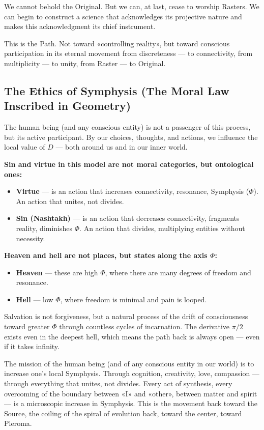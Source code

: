 \documentclass[a4paper,12pt]{article}
\begin{document}
	We cannot behold the Original. But we can, at last, cease to worship Rasters. We can begin to construct a science that acknowledges its projective nature and makes this acknowledgment its chief instrument.
	
	This is the Path. Not toward «controlling reality», but toward conscious participation in its eternal movement from discreteness — to connectivity, from multiplicity — to unity, from Raster — to Original.
	
	\subsection{The Ethics of Symphysis (The Moral Law Inscribed in Geometry)}
	
	The human being (and any conscious entity) is not a passenger of this process, but its active participant. By our choices, thoughts, and actions, we influence the local value of $D$ — both around us and in our inner world.
	
	\textbf{Sin and virtue in this model are not moral categories, but ontological ones:}
	\begin{itemize}
		\item \textbf{Virtue} — is an action that increases connectivity, resonance, Symphysis ($\Phi$). An action that unites, not divides.
		\item \textbf{Sin (Nashtakh)} — is an action that decreases connectivity, fragments reality, diminishes $\Phi$. An action that divides, multiplying entities without necessity.
	\end{itemize}
	
	\textbf{Heaven and hell are not places, but states along the axis $\Phi$:}
	\begin{itemize}
		\item \textbf{Heaven} — these are high $\Phi$, where there are many degrees of freedom and resonance.
		\item \textbf{Hell} — low $\Phi$, where freedom is minimal and pain is looped.
	\end{itemize}
	
	Salvation is not forgiveness, but a natural process of the drift of consciousness toward greater $\Phi$ through countless cycles of incarnation. The derivative $\pi/2$ exists even in the deepest hell, which means the path back is always open — even if it takes infinity.
	
	The mission of the human being (and of any conscious entity in our world) is to increase one's local Symphysis. Through cognition, creativity, love, compassion — through everything that unites, not divides. Every act of synthesis, every overcoming of the boundary between «I» and «other», between matter and spirit — is a microscopic increase in Symphysis. This is the movement back toward the Source, the coiling of the spiral of evolution back, toward the center, toward Pleroma.
	
\end{document}
